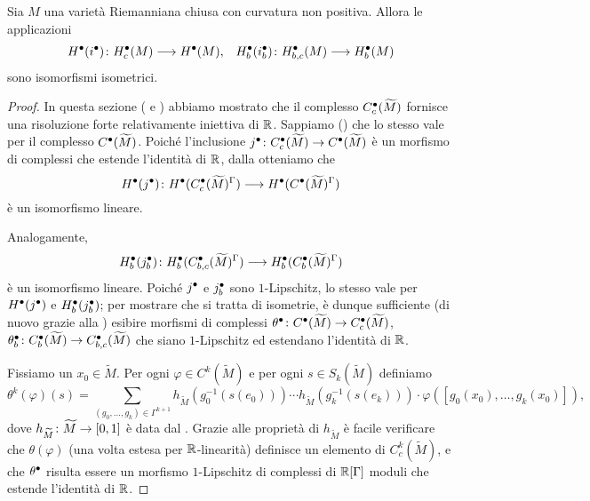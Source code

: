 \begin{proposition}
Sia $M$ una varietà Riemanniana chiusa con curvatura non positiva. Allora le applicazioni
\begin{align*}
\map{H^\bul(i^\bul)}{H^\bul_c(M)}{H^\bul(M)},&&\map{H^\bul_b(i^\bul_b)}{H^\bul_{b,c}(M)}{H^\bul_b(M)}
\end{align*}
sono isomorfismi isometrici. 
\end{proposition}
\begin{proof}
In questa sezione ( e ) abbiamo mostrato che il complesso $C^\bullet_c(\widetilde M)$ fornisce una risoluzione forte relativamente iniettiva di $\mathbb{R}$. Sappiamo () che lo stesso vale per il complesso $C^\bullet(\widetilde M)$. Poiché l'inclusione $\map{j^\bul}{C^\bul_c(\widetilde M)}{C^\bul(\widetilde M)}$ è un morfismo di complessi che estende l'identità di $\mathbb{R}$, dalla  otteniamo che 
\[
\map{H^\bul(j^\bul)}{H^\bul(C^\bul_c(\widetilde M)^\Gamma)}{H^\bul(C^\bul(\widetilde M)^\Gamma)}
\]
è un isomorfismo lineare.

Analogamente,
\[
\map{H^\bul_b(j^\bul_b)}{H^\bul_b(C^\bul_{b,c}(\widetilde M)^\Gamma)}{H^\bul_b(C^\bul_b(\widetilde M)^\Gamma)}
\]
è un isomorfismo lineare. Poiché $j^\bullet$ e $j^\bullet_b$ sono $1$-Lipschitz, lo stesso vale per $H^\bullet(j^\bullet)$ e $H^\bullet_b(j^\bullet_b)$; per mostrare che si tratta di isometrie, è dunque sufficiente (di nuovo grazie alla ) esibire morfismi di complessi $\map{\theta^\bul}{C^\bul(\widetilde M)}{C^\bul_c(\widetilde M)}$, $\map{\theta^\bul_b}{C^\bul_b(\widetilde M)}{C^\bul_{b,c}(\widetilde M)}$ che siano $1$-Lipschitz ed estendano l'identità di $\mathbb{R}$.

Fissiamo un $x_0\in\widetilde M$. Per ogni $\varphi\in C^k(\widetilde M)$ e per ogni $s\in S_k(\widetilde M)$ definiamo
\[
\theta^k(\varphi)(s)=\sum_{(g_0,\ldots,g_k)\in\Gamma^{k+1}}h_{\widetilde M}(g_0^{-1}(s(e_0)))\cdots h_{\widetilde M}(g_k^{-1}(s(e_k)))\cdot\varphi([g_0(x_0),\ldots,g_k(x_0)]),
\]
dove $\map{h_{\widetilde M}}{\widetilde M}{[0,1]}$ è data dal . Grazie alle proprietà di $h_{\widetilde M}$ è facile verificare che $\theta(\varphi)$ (una volta estesa per $\mathbb{R}$-linearità) definisce un elemento di $C^k_c(\widetilde M)$, e che $\theta^\bullet$ risulta essere un morfismo $1$-Lipschitz di complessi di $\mathbb{R}[\Gamma]$ moduli che estende l'identità di $\mathbb{R}$.


\end{proof}
